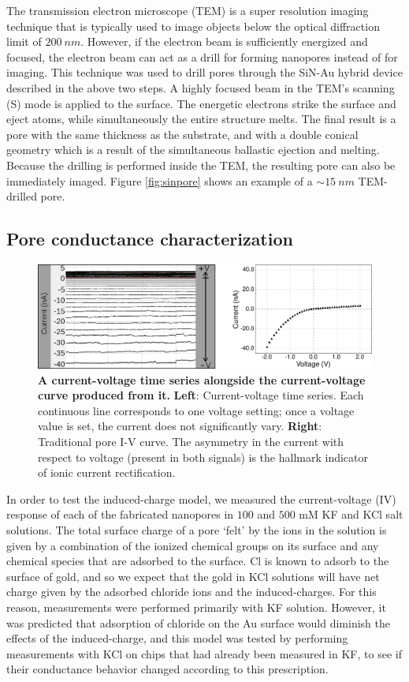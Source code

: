 		
			The transmission electron microscope (TEM) is a super resolution imaging technique that is typically used to image objects below the optical diffraction limit of $\SI{200}{nm}$. However, if the electron beam is sufficiently energized and focused, the electron beam can act as a drill for forming nanopores instead of for imaging. This technique was used to drill pores through the SiN-Au hybrid device described in the above two steps. A highly focused beam in the TEM's scanning (S) mode is applied to the surface. The energetic electrons strike the surface and eject atoms, while simultaneously the entire structure melts. The final result is a pore with the same thickness as the substrate, and with a double conical geometry which is a result of the simultaneous ballastic ejection and melting. Because the drilling is performed inside the TEM, the resulting pore can also be immediately imaged. Figure \ref{fig:sinpore} shows an example of a $\sim\SI{15}{nm}$ TEM-drilled pore.
			
		\subsection{Pore conductance characterization}
		
			\begin{figure}
				\includegraphics[width=\textwidth]{siniv.png}
				\caption{\textbf{A current-voltage time series alongside the current-voltage curve produced from it.} \textbf{Left}: Current-voltage time series. Each continuous line corresponds to one voltage setting; once a voltage value is set, the current does not significantly vary. \textbf{Right}: Traditional pore I-V curve. The asymmetry in the current with respect to voltage (present in both signals) is the hallmark indicator of ionic current rectification.}
				\label{fig:siniv}
			\end{figure}

		
			In order to test the induced-charge model, we measured the current-voltage (IV) response of each of the fabricated nanopores in $100$ and $500$ mM KF and KCl salt solutions. The total surface charge of a pore `felt' by the ions in the solution is given by a combination of the ionized chemical groups on its surface and any chemical species that are adsorbed to the surface. Cl is known to adsorb to the surface of gold, and so we expect that the gold in KCl solutions will have net charge given by the adsorbed chloride ions and the induced-charges. For this reason, measurements were performed primarily with KF solution. However, it was predicted that adsorption of chloride on the Au surface would diminish the effects of the induced-charge, and this model was tested by performing measurements with KCl on chips that had already been measured in KF, to see if their conductance behavior changed according to this prescription. 
			
